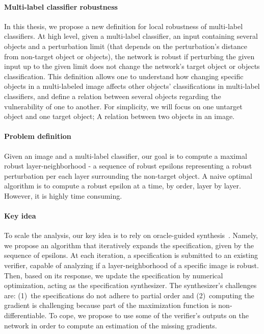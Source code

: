 \paragraph{Multi-label classifier robustness}
In this thesis, we propose a new definition for local robustness of multi-label classifiers.
At high level, given a multi-label classifier, an input containing several objects and a perturbation limit (that depends on the perturbation's distance from non-target object or objects), the network is robust if perturbing the given input up to the given limit does not change the network's target object or objects classification.
This definition allows one to understand how changing specific objects in a multi-labeled image affects other objects' classifications in multi-label classifiers, and define a relation between several objects regarding the vulnerability of one to another.
For simplicity, we will focus on one untarget object and one target object;
A relation between two objects in an image.

\paragraph{Problem definition} Given an image and a multi-label classifier, our goal is to compute a maximal robust layer-neighborhood - a sequence of robust epsilons representing a robust perturbation per each layer surrounding the non-target object.
A naive optimal algorithm is to compute a robust epsilon at a time, by order, layer by layer.
However, it is highly time consuming.

\paragraph{Key idea} To scale the analysis, our key idea is to rely on oracle-guided synthesis~\cite{OracleGuided}.
Namely, we propose an algorithm that iteratively expands the specification, given by the sequence of epsilons.
At each iteration, a specification is submitted to an existing verifier, capable of analyzing if a layer-neighborhood of a specific image is robust.
Then, based on its response, we update the specification by numerical optimization, acting as the specification synthesizer.
The synthesizer's challenges are: (1)~the specifications do not adhere to partial order and (2)~computing the gradient is challenging because part of the maximization function is non-differentiable.
To cope, we propose to use some of the verifier's outputs on the network in order to compute an estimation of the missing gradients.

